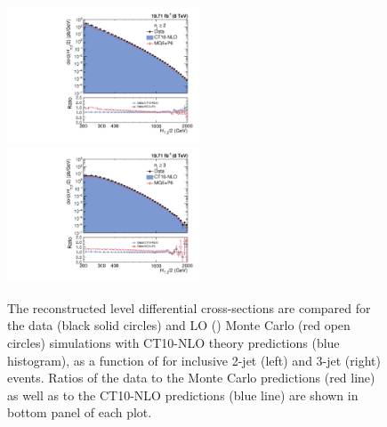 \begin{figure}[!htbp]
 \begin{center}
 \hspace*{-5mm}\includegraphics[width=0.51\textwidth]{Plots_HT_2_150/Comparison_all_2_HT_2_150.pdf}%
 ~~\includegraphics[width=0.51\textwidth]{Plots_HT_2_150/Comparison_all_3_HT_2_150.pdf}
 \caption[Comparison of differential cross-sections for the data with simulated events and CT10-NLO theory predictions.]{The reconstructed level differential cross-sections are compared for the data (black solid circles) and LO \MadGraphFn\plusn \PYTHIAS (\MGP) Monte Carlo (red open circles) simulations with CT10-NLO theory predictions (blue histogram), as a function of \httwo for inclusive 2-jet (left) and 3-jet (right) events. Ratios of the data to the Monte Carlo predictions (red line) as well as to the CT10-NLO predictions (blue line) are shown in bottom panel of each plot.}
 \label{fig:comp_all}
 \end{center}
\end{figure}

